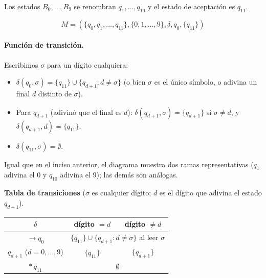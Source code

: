 \documentclass[12pt]{article}
\begin{document}
Los estados $B_0,\dots,B_9$ se renombran $q_1,\dots,q_{10}$ y el estado de aceptación es $q_{11}$.

\[
M=(\{q_0,q_1,\dots,q_{11}\},\{0,1,\dots,9\},\delta,q_0,\{q_{11}\})
\]

\paragraph{Función de transición.} Escribimos $\sigma$ para un dígito cualquiera:
\begin{itemize}
  \item $\delta(q_0,\sigma)=\{q_{11}\}\cup\{q_{d+1} : d\neq\sigma\}$ (o bien $\sigma$ es el único símbolo, o adivina un final $d$ distinto de $\sigma$).
  \item Para $q_{d+1}$ (adivinó que el final es $d$): $\delta(q_{d+1},\sigma)=\{q_{d+1}\}$ si $\sigma\neq d$, y $\delta(q_{d+1},d)=\{q_{11}\}$.
  \item $\delta(q_{11},\sigma)=\emptyset$.
\end{itemize}

\noindent Igual que en el inciso anterior, el diagrama muestra dos ramas representativas ($q_1$ adivina el $0$ y $q_{10}$ adivina el $9$); las demás son análogas.

\begin{center}
\end{center}

\noindent\textbf{Tabla de transiciones} ($\sigma$ es cualquier dígito; $d$ es el dígito que adivina el estado $q_{d+1}$).
\begin{center}
\begin{tabular}{c|cc}
$\delta$ & dígito $=d$ & dígito $\neq d$\\ \hline
$\rightarrow q_0$ & \multicolumn{2}{c}{$\{q_{11}\}\cup\{q_{d+1} : d\neq\sigma\}$ al leer $\sigma$}\\ \hline
$q_{d+1}$ ($d=0,\dots,9$) & $\{q_{11}\}$ & $\{q_{d+1}\}$\\ \hline
$*\,q_{11}$ & \multicolumn{2}{c}{$\emptyset$}\\
\end{tabular}
\end{center}
\end{document}
